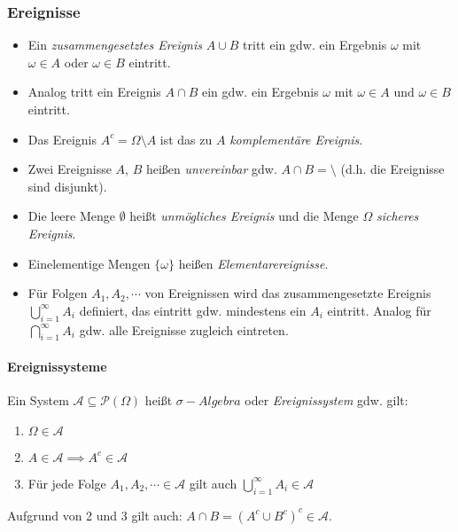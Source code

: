 \documentclass[a4paper, 11pt, accentcolor = tud3b]{tudreport}
\begin{document}
                \subsubsection{Ereignisse}
                    \begin{itemize}
                    	\item Ein \textit{zusammengesetztes Ereignis} \( A \cup B \) tritt ein gdw. ein Ergebnis \(\omega\) mit \(\omega \in A\) oder \(\omega \in B\) eintritt.
                    	\item Analog tritt ein Ereignis \( A \cap B \) ein gdw. ein Ergebnis \(\omega\) mit \(\omega \in A\) und \(\omega \in B\) eintritt.
                    	\item Das Ereignis \( A ^ c = \Omega \setminus A \) ist das zu \(A\) \textit{komplementäre Ereignis}.
                    	\item Zwei Ereignisse \(A\), \(B\) heißen \textit{unvereinbar} gdw. \( A \cap B = \setminus \) (d.h. die Ereignisse sind disjunkt).
                    	\item Die leere Menge \(\emptyset\) heißt \textit{unmögliches Ereignis} und die Menge \(\Omega\) \textit{sicheres Ereignis}.
                    	\item Einelementige Mengen \( \{ \omega \} \) heißen \textit{Elementarereignisse}.
                    	\item Für Folgen \( A_1, A_2, \cdots \) von Ereignissen wird das zusammengesetzte Ereignis \( \bigcup_{i = 1}^\infty A_i \) definiert, das eintritt gdw. mindestens ein \(A_i\) eintritt. Analog für \( \bigcap_{i = 1}^\infty A_i \) gdw. alle Ereignisse zugleich eintreten.
                    \end{itemize}

                    \paragraph{Ereignissysteme}
                        Ein System \( \mathcal{A} \subseteq \mathcal{P}(\Omega) \) heißt \textit{\(\sigma-Algebra\)} oder \textit{Ereignissystem} gdw. gilt:
                        \begin{enumerate}
                        	\item \( \Omega \in \mathcal{A} \)
                        	\item \( A \in \mathcal{A} \implies A^c \in \mathcal{A} \)
                        	\item Für jede Folge \( A_1, A_2, \cdots \in \mathcal{A} \) gilt auch \( \bigcup_{i = 1}^\infty A_i \in \mathcal{A} \)
                        \end{enumerate}
	                    Aufgrund von 2 und 3 gilt auch: \( A \cap B = (A^c \cup B^c)^c \in \mathcal{A} \).
	                    
\end{document}
